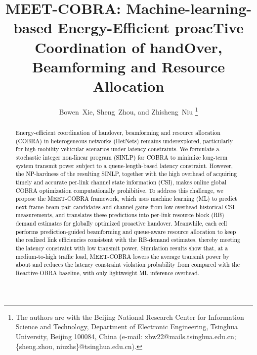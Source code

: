 \documentclass[10pt,journal,letterpaper]{journal_template/IEEEtran}
\newcommand{\rev}[1]{\textcolor{revisioncolor}{{}#1}}
\newif\ifshowdeletions
\newcommand{\currentdel}[1]{\ifshowdeletions\textcolor{deletioncolor}{\sout{#1}}\fi}
\theoremstyle{remark}
\begin{document}
\title{MEET-COBRA: Machine-learning-based Energy-Efficient proacTive Coordination of handOver, Beamforming and Resource Allocation}


\author{Bowen~Xie, Sheng~Zhou, and Zhisheng~Niu%
\thanks{The authors are with the Beijing National Research Center for Information Science and Technology, Department of Electronic Engineering, Tsinghua University, Beijing 100084, China (e-mail: xbw22@mails.tsinghua.edu.cn; \{sheng.zhou, niuzhs\}@tsinghua.edu.cn).}
}

\maketitle

\begin{abstract}
\textcolor{black}{
Energy-efficient coordination of handover, beamforming and resource allocation (COBRA) in heterogeneous networks (HetNets) remains underexplored, particularly for high-mobility vehicular scenarios under latency constraints.
We formulate a stochastic integer non-linear program (SINLP) for COBRA to minimize long-term system transmit power subject to a queue-length-based latency constraint.
However, the NP-hardness of the resulting SINLP, together with the high overhead of acquiring timely and accurate per-link channel state information (CSI), makes online global COBRA optimization computationally prohibitive.
To address this challenge, we propose the MEET-COBRA framework, which uses machine learning (ML) to predict next-frame beam-pair candidates and channel gains from low-overhead historical CSI measurements, and translates these predictions into per-link resource block (RB) demand estimates for globally optimized proactive handover. 
Meanwhile, each cell performs prediction-guided beamforming and queue-aware resource allocation to keep the realized link efficiencies consistent with the RB-demand estimates, thereby meeting the latency constraint with low transmit power.
Simulation results show that, at a medium-to-high traffic load, MEET-COBRA lowers the average transmit power by about \currentdel{32\%} and reduces the latency constraint violation probability from \currentdel{29.47\% to 0.68\%} compared with the Reactive-OBRA baseline, with only lightweight ML inference overhead.
}
\end{abstract}
\end{document}

